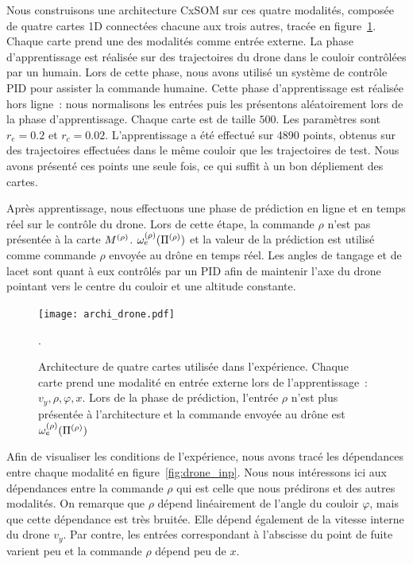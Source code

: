 \documentclass[../main]{subfiles}
\begin{document}
Nous construisons une architecture CxSOM sur ces quatre modalités, composée de quatre cartes 1D connectées chacune aux trois autres, tracée en figure~\ref{fig:archi_drone}. Chaque carte prend une des modalités comme entrée externe.
La phase d'apprentissage est réalisée sur des trajectoires du drone dans le couloir contrôlées par un humain.
Lors de cette phase, nous avons utilisé un système de contrôle PID pour assister la commande humaine. 
Cette phase d'apprentissage est réalisée hors ligne~: nous normalisons les entrées puis les présentons aléatoirement lors de la phase d'apprentissage.
Chaque carte est de taille $500$. Les paramètres sont $r_e = 0.2$ et $r_c = 0.02$.
L'apprentissage a été effectué sur 4890 points, obtenus sur des trajectoires effectuées dans le même couloir que les trajectoires de test. Nous avons présenté ces points une seule fois, ce qui suffit à un bon dépliement des cartes.


Après apprentissage, nous effectuons une phase de prédiction en ligne et en temps réel sur le contrôle du drone.
Lors de cette étape, la commande $\rho$ n'est pas présentée à la carte $M^{({\rho})}$. $\omega_e^{({\rho})}(\Pi^{({\rho})})$ et la valeur de la prédiction est utilisé comme commande $\rho$ envoyée au drône en temps réel.
Les angles de tangage et de lacet sont quant à eux contrôlés par un PID afin de maintenir l'axe du drone pointant vers le centre du couloir et une altitude constante.

\begin{figure}
	\centering\texttt{[image: archi\_drone.pdf]}
	\caption{Architecture de quatre cartes utilisée dans l'expérience. Chaque carte prend une modalité en entrée externe lors de l'apprentissage~: $v_y,\rho,\varphi,x$. Lors de la phase de prédiction, l'entrée $\rho$ n'est plus présentée à l'architecture et la commande envoyée au drône est $\omega_e^{({\rho})}(\Pi^{({\rho})})$\label{fig:archi_drone}}.
\end{figure}

Afin de visualiser les conditions de l'expérience, nous avons tracé les dépendances entre chaque modalité en figure~\ref{fig:drone_inp}.
Nous nous intéressons ici aux dépendances entre la commande $\rho$ qui est celle que nous prédirons et des autres modalités.
On remarque que $\rho$ dépend linéairement de l'angle du couloir $\varphi$, mais que cette dépendance est très bruitée. Elle dépend également de la vitesse interne du drone $v_y$. Par contre, les entrées correspondant à l'abscisse du point de fuite varient peu et la commande $\rho$ dépend peu de $x$.
\end{document}
